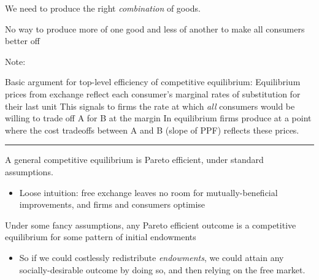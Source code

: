 \documentclass[]{article}
\providecommand{\tightlist}{%
  \setlength{\itemsep}{0pt}\setlength{\parskip}{0pt}}
\begin{document}
We need to produce the right \emph{combination} of goods.

\bigskip
\bigskip

\begin{description}
\tightlist
\item[Efficient allocation of resources (`top-level' condition)]
No way to produce more of one good and less of another to make all
consumers better off
\end{description}

Note:

Basic argument for top-level efficiency of competitive equilibrium:
Equilibrium prices from exchange reflect each consumer's marginal rates
of substitution for their last unit This signals to firms the rate at
which \emph{all} consumers would be willing to trade off A for B at the
margin In equilibrium firms produce at a point where the cost tradeoffs
between A and B (slope of PPF) reflects these prices.

\begin{center}\rule{0.5\linewidth}{\linethickness}\end{center}

\begin{description}
\tightlist
\item[First fundamental theorem of welfare economics]
A general competitive equilibrium is Pareto efficient, under standard
assumptions.
\end{description}

\begin{itemize}
\tightlist
\item
  Loose intuition: free exchange leaves no room for mutually-beneficial
  improvements, and firms and consumers optimise
\end{itemize}

\begin{description}
\tightlist
\item[Second fundamental theorem]
Under some fancy assumptions, any Pareto efficient outcome is a
competitive equilibrium for some pattern of initial endowments
\end{description}

\begin{itemize}
\tightlist
\item
  So if we could costlessly redistribute \emph{endowments}, we could
  attain any socially-desirable outcome by doing so, and then relying on
  the free market.
\end{itemize}
\end{document}
